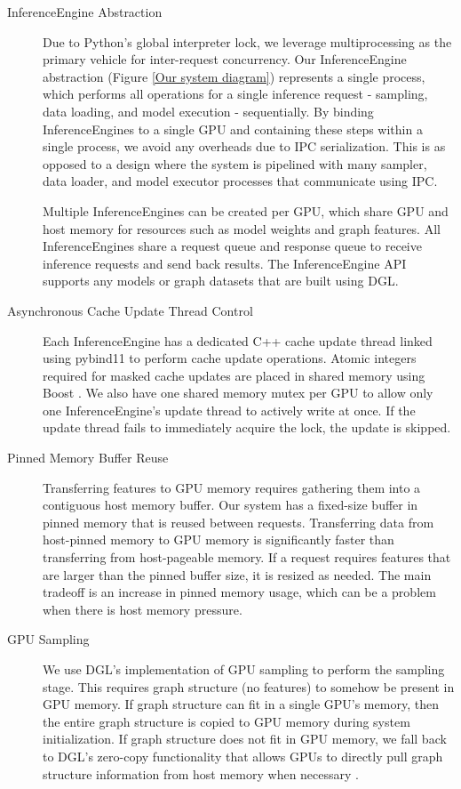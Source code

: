 \begin{description}
    \item[InferenceEngine Abstraction] Due to Python's global interpreter lock, we leverage multiprocessing as the primary vehicle for inter-request concurrency. Our InferenceEngine abstraction (Figure \ref{Our system diagram}) represents a single process, which performs all operations for a single inference request - sampling, data loading, and model execution - sequentially. By binding InferenceEngines to a single GPU and containing these steps within a single process, we avoid any overheads due to IPC serialization. This is as opposed to a design where the system is pipelined with many sampler, data loader, and model executor processes that communicate using IPC. 

    Multiple InferenceEngines can be created per GPU, which share GPU and host memory for resources such as model weights and graph features. All InferenceEngines share a request queue and response queue to receive inference requests and send back results. The InferenceEngine API supports any models or graph datasets that are built using DGL.

    \item[Asynchronous Cache Update Thread Control] Each InferenceEngine has a dedicated C++ cache update thread linked using pybind11 \cite{pybind11} to perform cache update operations. Atomic integers required for masked cache updates are placed in shared memory using Boost \cite{BoostLibrary}. We also have one shared memory mutex per GPU to allow only one InferenceEngine's update thread to actively write at once. If the update thread fails to immediately acquire the lock, the update is skipped.

    \item[Pinned Memory Buffer Reuse] Transferring features to GPU memory requires gathering them into a contiguous host memory buffer. Our system has a fixed-size buffer in pinned memory that is reused between requests. Transferring data from host-pinned memory to GPU memory is significantly faster than transferring from host-pageable memory. If a request requires features that are larger than the pinned buffer size, it is resized as needed. The main tradeoff is an increase in pinned memory usage, which can be a problem when there is host memory pressure.

    \item[GPU Sampling] We use DGL's implementation of GPU sampling to perform the sampling stage. This requires graph structure (no features) to somehow be present in GPU memory. If graph structure can fit in a single GPU's memory, then the entire graph structure is copied to GPU memory during system initialization. If graph structure does not fit in GPU memory, we fall back to DGL's zero-copy functionality that allows GPUs to directly pull graph structure information from host memory when necessary \cite{PyTorch_Direct_2021}. 


\end{description}
